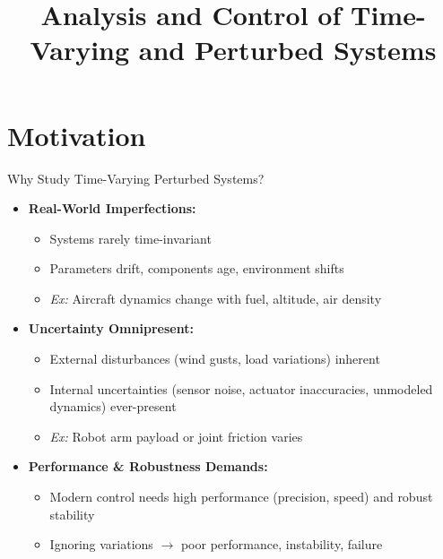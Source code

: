 \documentclass[student, noshadow, lsr, english, aspectratio=169, t]{ITR_LSR_slides}
\title{Analysis and Control of Time-Varying and Perturbed Systems}
\begin{document}
\begin{frame}
    \titlepage
\end{frame}


\section{Motivation}

\begin{frame}{Why Study Time-Varying Perturbed Systems?}
	\begin{itemize}
		\item \textbf{Real-World Imperfections:}
		\begin{itemize}
			\item Systems rarely time-invariant
			\item Parameters drift, components age, environment shifts
			\item \textit{Ex:} Aircraft dynamics change with fuel, altitude, air density
		\end{itemize}
		\item \textbf{Uncertainty Omnipresent:}
		\begin{itemize}
			\item External disturbances (wind gusts, load variations) inherent
			\item Internal uncertainties (sensor noise, actuator inaccuracies, unmodeled dynamics) ever-present
			\item \textit{Ex:} Robot arm payload or joint friction varies
		\end{itemize}
		\item \textbf{Performance \& Robustness Demands:}
		\begin{itemize}
			\item Modern control needs high performance (precision, speed) and robust stability
			\item Ignoring variations $\rightarrow$ poor performance, instability, failure
		\end{itemize}
	\end{itemize}
\end{frame}
\end{document}
